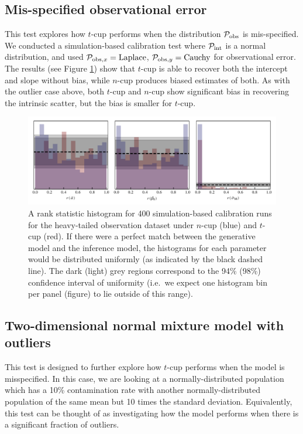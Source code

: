 \documentclass[fleqn,usenatbib]{rasti}
\begin{document}
\subsection{Mis-specified observational error}

This test explores how $t$-cup performs when the distribution $\mathcal P_{\rm
obs}$ is mis-specified. We conducted a simulation-based calibration test where
$\mathcal P_{\rm int}$ is a normal distribution, and used $\mathcal P_{{\rm
obs}, x} = {\rm Laplace}$, $\mathcal P_{{\rm obs}, y} = {\rm Cauchy}$ for
observational error. The results (see Figure \ref{fig:results.obs.sbc}) show
that $t$-cup is able to recover both the intercept and slope without bias, while
$n$-cup produces biased estimates of both. As with the outlier case above, both
$t$-cup and $n$-cup show significant bias in recovering the intrinsic scatter,
but the bias is smaller for $t$-cup.

\begin{figure}
    \includegraphics[width=\textwidth]{graphics/sbc/mixed_obs_sbc.pdf}
    \caption{A rank statistic histogram for 400 simulation-based calibration
    runs for the heavy-tailed observation dataset under $n$-cup (blue) and
    $t$-cup (red). If there were a perfect match between the generative model
    and the inference model, the histograms for each parameter would be
    distributed uniformly (as indicated by the black dashed line). The dark
    (light) grey regions correspond to the 94\% (98\%) confidence interval of
    uniformity (i.e.\ we expect one histogram bin per panel (figure) to lie
    outside of this range).}
    \label{fig:results.obs.sbc}
\end{figure}

\subsection{Two-dimensional normal mixture model with outliers}
\label{sec:results.gmm}

This test is designed to further explore how $t$-cup performs when the model is
misspecified. In this case, we are looking at a normally-distributed population
which has a 10\% contamination rate with another normally-distributed population
of the same mean but 10 times the standard deviation. Equivalently, this test
can be thought of as investigating how the model performs when there is a
significant fraction of outliers.
\end{document}
